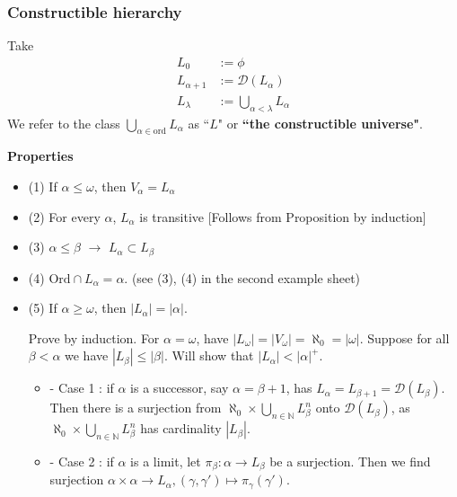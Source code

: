 \documentclass[12pt,a4paper]{article}
\newenvironment{subproof}
{\begin{changemargin}{0.5cm}{0.5cm} 
	}%
	{\end{changemargin}
}
\renewenvironment{i}
{\begin{itemize} 
	}%
	{\end{itemize}
}
\begin{document}
\subsubsection*{Constructible hierarchy}

 Take \begin{align*}
L_0 &:= \phi \\
L_{\alpha+1} &:= \mathscr{D}(L_{\alpha}) \\
L_{\lambda} &:= \bigcup_{\alpha < \lambda} L_{\alpha}
\end{align*}
We refer to the class $\bigcup_{\alpha \in \text{ord}} L_{\alpha}$ as ``$L$" or \textbf{``the constructible universe"}.
\s

\textbf{Properties}
\begin{i}
\item[(1)] If $\alpha \leq \omega$, then $V_{\alpha} = L_{\alpha}$
\item[(2)] For every $\alpha$, $L_{\alpha}$ is transitive [Follows from Proposition by induction]
\item[(3)] $\alpha \leq \beta$ $\rightarrow$ $L_{\alpha} \subset L_{\beta}$
\item[(4)] $\text{Ord} \cap L_{\alpha} = \alpha$. (see (3), (4) in the second example sheet)
\item[(5)] If $\alpha \geq \omega$, then $|L_{\alpha}| = |\alpha|$.
\begin{subproof}
\pf Prove by induction. For $\alpha = \omega$, have $|L_{\omega}| = |V_{\omega}| = \aleph_0 = |\omega|$. Suppose for all $\beta < \alpha$ we have $|L_{\beta} |\leq |\beta|$. Will show that $|L_{\alpha}| < |\alpha|^+$. 
\begin{i}
\item[-] Case 1 : if $\alpha$ is a successor, say $\alpha = \beta +1$, has $L_{\alpha} = L_{\beta+1} = \mathscr{D}(L_{\beta})$. Then there is a surjection from $\aleph_0 \times \bigcup_{n\in \mathbb{N}}L_{\beta}^n$ onto $\mathscr{D}(L_{\beta})$, as $\aleph_0 \times \bigcup_{n\in \mathbb{N}}L_{\beta}^n$ has cardinality $|L_{\beta}|$.
\item[-] Case 2 : if $\alpha$ is a limit, let $\pi_{\beta} : \alpha \rightarrow L_{\beta}$ be a surjection. Then we find surjection $\alpha\times \alpha \rightarrow L_{\alpha}, (\gamma, \gamma') \mapsto \pi_{\gamma}(\gamma')$.

\eop
\end{i}
\end{subproof}
\end{i}
\s
\end{document}
